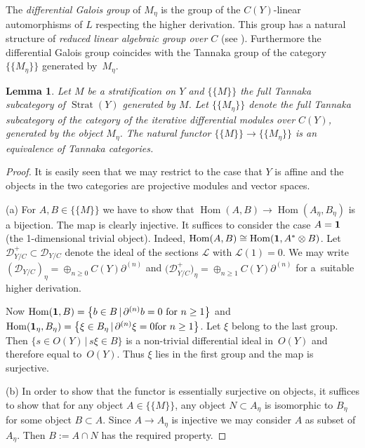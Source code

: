 \documentclass[10pt,a4paper]{amsart}
\numberwithin{equation}{section}
\newtheorem{Lemma}[Theorem]{Lemma}
\begin{document}
The {\it differential Galois group} of $M_\eta$ is the group of the $C(Y)$-linear automorphisms of $L$ respecting the higher derivation. This group has a natural structure of {\it reduced linear algebraic group over $C$} (see \cite[p.~8]{Ma-vdP1}). Furthermore the differential Galois group coincides with the Tannaka group of the category $\{\{ M_\eta \}\}$ generated by~$M_\eta$.

\begin{Lemma}\label{2.*} Let $M$ be a stratification on $Y$ and $\{\{M\}\}$ the full Tannaka subcategory of $\operatorname{Strat}(Y)$ generated by $M$. Let $\{\{M_\eta \}\}$ denote the full Tannaka subcategory of the category of the iterative differential modules over $C(Y)$, generated by the object $M_\eta$. The natural functor $\{\{M\}\}\rightarrow \{\{M_\eta \}\}$ is an equivalence of Tannaka categories.
\end{Lemma}
\begin{proof} It is easily seen that we may restrict to the case that $Y$ is affine and the objects in the two categories are projective modules and vector spaces.

 (a) For $A,B\in \{\{M\}\}$ we have to show that $\operatorname{Hom}(A,B)\rightarrow \operatorname{Hom}(A_\eta ,B_\eta)$ is a bijection. The map is clearly injective. It suffices to consider the case $A=\bf{1}$ (the 1-dimensional trivial object). Indeed, $\operatorname{Hom}(A,B)\cong \operatorname{Hom}({\bf 1}, A^*\otimes B)$. Let $\mathcal{D}^+_{Y/C}\subset \mathcal{D}_{Y/C}$ denote the ideal of the sections $\mathcal{L}$ with $\mathcal{L}(1)=0$. We may write $(\mathcal{D}_{Y/C})_\eta=\oplus _{n\geq 0}C(Y) \partial ^{(n)}$ and $\big(\mathcal{D}^+_{Y/C}\big)_\eta=\oplus _{n\geq 1}C(Y) \partial ^{(n)}$ for a~suitable higher derivation.

Now $\operatorname{Hom}({\bf 1},B)=\big\{ b\in B\,|\, \partial ^{(n)}b=0 \ \text{for} \ n\geq 1\big\}$ and $\operatorname{Hom}({\bf 1}_\eta,B_\eta)=\big\{\xi \in B_\eta \, | \, \partial ^{(n)}\xi =0 \allowbreak \text{for} \ n\geq 1\big\}$. Let $\xi$ belong to the last group. Then $\{s\in O(Y)\, | \, s\xi \in B\}$ is a non-trivial differential ideal in~$O(Y)$ and therefore equal to~$O(Y)$. Thus $\xi$ lies in the first group and the map is surjective.

(b) In order to show that the functor is essentially surjective on objects, it suffices to show that for any object $A\in \{\{M\}\}$, any object $N\subset A_\eta$ is isomorphic to $B_\eta$ for some object $B\subset A$. Since $A\rightarrow A_\eta$ is injective we may consider $A$ as subset of $A_\eta$. Then $B:=A\cap N$ has the required property. \end{proof}
\end{document}
